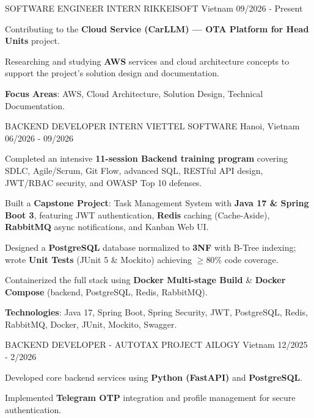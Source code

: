 \begin{cventries}
  \cventry
    {SOFTWARE ENGINEER INTERN}
    {RIKKEISOFT}
    {Vietnam}
    {09/2026 - Present}
    {
      \begin{cvitems}
        \item {Contributing to the \textbf{Cloud Service (CarLLM) --- OTA Platform for Head Units} project.}
        \item {Researching and studying \textbf{AWS} services and cloud architecture concepts to support the project's solution design and documentation.}
        \item {\textbf{Focus Areas}: AWS, Cloud Architecture, Solution Design, Technical Documentation.}
      \end{cvitems}
    }
  
  \cventry
    {BACKEND DEVELOPER INTERN}
    {VIETTEL SOFTWARE}
    {Hanoi, Vietnam}
    {06/2026 - 09/2026}
    {
      \begin{cvitems}
        \item {Completed an intensive \textbf{11-session Backend training program} covering SDLC, Agile/Scrum, Git Flow, advanced SQL, RESTful API design, JWT/RBAC security, and OWASP Top 10 defenses.}
        \item {Built a \textbf{Capstone Project}: Task Management System with \textbf{Java 17 \& Spring Boot 3}, featuring JWT authentication, \textbf{Redis} caching (Cache-Aside), \textbf{RabbitMQ} async notifications, and Kanban Web UI.}
        \item {Designed a \textbf{PostgreSQL} database normalized to \textbf{3NF} with B-Tree indexing; wrote \textbf{Unit Tests} (JUnit 5 \& Mockito) achieving \textbf{$\ge 80\%$} code coverage.}
        \item {Containerized the full stack using \textbf{Docker Multi-stage Build} \& \textbf{Docker Compose} (backend, PostgreSQL, Redis, RabbitMQ).}
        \item {\textbf{Technologies}: Java 17, Spring Boot, Spring Security, JWT, PostgreSQL, Redis, RabbitMQ, Docker, JUnit, Mockito, Swagger.}
      \end{cvitems}
    }
  \cventry
    {BACKEND DEVELOPER - AUTOTAX PROJECT}
    {AILOGY}
    {Vietnam}
    {12/2025 - 2/2026}
    {
      \begin{cvitems}
        \item {Developed core backend services using \textbf{Python (FastAPI)} and \textbf{PostgreSQL}.}
        \item {Implemented \textbf{Telegram OTP} integration and profile management for secure authentication.}

\end{cvitems}}
\end{cventries}
